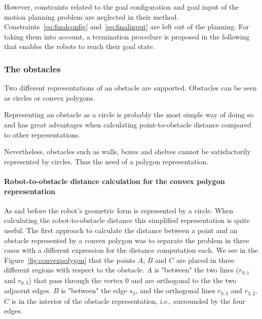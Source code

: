 However, constraints related to the goal configuration and goal input of the motion planning problem are
neglected in their method.
Constraints~\ref{eq:finalconfig} and~\ref{eq:finalinput} are left out of the planning.
For taking them into account, a termination procedure is proposed in the following that enables the robots to reach their goal state.

\subsubsection{The obstacles}


Two different representations of an obstacle are supported. Obstacles can be seen as circles or convex polygons.

Representing an obstacle as a circle is probably the most simple way of doing so and has great advantages when
calculating point-to-obstacle distance compared to other representations.

Nevertheless, obstacles such as walls, boxes and shelves cannot be satisfactorily represented by circles.
Thus the need of a polygon representation.


\paragraph{Robot-to-obstacle distance calculation for the convex polygon representation}

As sad before the robot's geometric form is represented by a circle.
When calculating the robot-to-obstacle distance this simplified representation is quite useful. 
The first approach to calculate the distance between a point and an obstacle represented by a convex polygon
was to separate the problem in three cases with a different expression for the distance computation each.
We see in the Figure~\ref{fig:convexpolygon} that the points $A$, $B$ and $C$ are placed in three different
regions with respect to the obstacle. $A$ is "between" the two lines ($r_{0,1}$ and $r_{0,3}$) that pass through
the vertex $0$ and are orthogonal to the the two adjacent edges. $B$ is "between" the edge $s_{3}$, and the
orthogonal lines $r_{0,3}$ and $r_{3,2}$. $C$ is in the interior of the obstacle representation, i.e., surrounded by the four edges.

